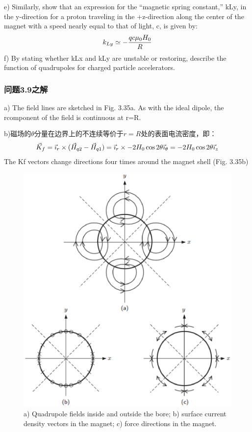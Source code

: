 e) Similarly, show that an expression for the “magnetic spring constant,” kLy,
in the y-direction for a proton traveling in the +z-direction along the center
of the magnet with a speed nearly equal to that of light, c, is given by:
$$
k_{Ly}\simeq-\frac{qc\mu_{0}H_{0}}{R}\\%
$$
f) By stating whether kLx and kLy are unstable or restoring, describe the function of quadrupoles for charged particle accelerators.

\subsubsection{问题3.9之解}
a) The field lines are sketched in Fig. 3.35a. As with the ideal dipole, the rcomponent of the field is continuous at r=R.

b)磁场的$\theta$分量在边界上的不连续等价于$r=R$处的表面电流密度，即：
$$\vec{K}_{f}=\vec{\imath}_{r}\times(\vec{H}_{q2}-\vec{H}_{q1})=\vec{\imath}_{r}\times-2H_{0}\cos2\theta\vec{\imath}_{\theta}\\
=-2H_{0}\cos2\theta\vec{\imath}_{z}\\%
$$
The Kf vectors change directions four times around the magnet shell (Fig. 3.35b)
\begin{figure}[htbp]
	\centering
	\includegraphics[scale=0.5]{chpt3/figs/fig3.35.eps}
	\caption{a) Quadrupole fields inside and outside the bore; b) surface current
		density vectors in the magnet; c) force directions in the magnet.}
\end{figure}

